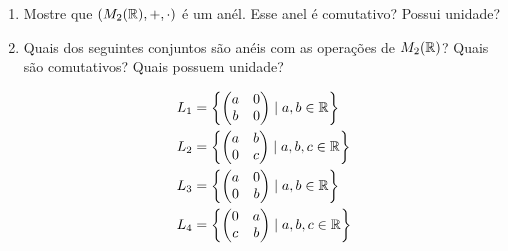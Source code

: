\documentclass[12pt]{exam}
\begin{document}
    \begin{enumerate}[label=({\alph*})]
        \item Mostre que $(M_2(\mathbb{R}), + , \cdot)$ \'e um an\'el. Esse anel \'e comutativo? Possui unidade?
        \item Quais dos seguintes conjuntos s\~ao an\'eis com as opera\c{c}\~oes de $M_2(\mathbb{R})$? Quais s\~ao comutativos? Quais possuem unidade?

        \begin{align*}
            L_1 &= \left\{\begin{pmatrix}
                a & 0\\
                b & 0
            \end{pmatrix} \mid a, b \in \mathbb{R}\right\}\\
            L_2 &= \left\{\begin{pmatrix}
                a & b\\
                0 & c
            \end{pmatrix} \mid a, b, c \in \mathbb{R}\right\}\\
            L_3 &= \left\{\begin{pmatrix}
                a & 0\\
                0 & b
            \end{pmatrix} \mid a, b \in \mathbb{R}\right\}\\
            L_4 &= \left\{\begin{pmatrix}
                0 & a\\
                c & b
            \end{pmatrix} \mid a, b, c \in \mathbb{R}\right\}
        \end{align*}
    \end{enumerate}

    \vspace{.3cm}
\end{document}
